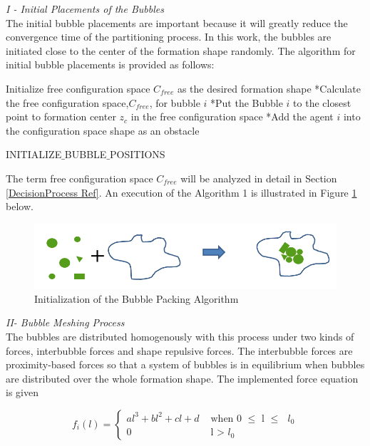 \textit{			I - Initial Placements of the Bubbles} \\ 
The initial bubble placements are important because it will greatly reduce the convergence time of the partitioning process. In this work, the bubbles are initiated close to the center of the formation shape randomly. The algorithm for initial bubble placements is provided as follows:
			
\begin{algorithm}[H]
Initialize free configuration space $C_{free}$ as the desired formation shape \newline
{}
{		
*Calculate the free configuration space,$C_{free}$, for bubble $i$\;
*Put the Bubble $i$ to the closest point to  formation center  $z_c$  in the free configuration space\;
*Add the agent $i$ into the configuration space shape as an obstacle \;
}
				
\caption{INITIALIZE$\_$BUBBLE$\_$POSITIONS}
\end{algorithm}
		
The term free configuration space $C_{free}$ will be analyzed in detail in Section \ref{DecisionProcess Ref}. An execution of the Algorithm 1 is illustrated in Figure \ref{algorithm1_ref} below.
		
\begin{figure}[H]
\caption{Initialization of the Bubble Packing Algorithm} \label{algorithm1_ref}
\centering
\includegraphics[scale = 0.50]{bubble_packing}
\end{figure}
				
\textit{			II- Bubble Meshing Process } \\ 
The bubbles are distributed homogenously with this process under two kinds of forces, interbubble forces and shape repulsive forces. The interbubble forces are proximity-based forces so that a system of bubbles is in equilibrium when bubbles are distributed over the whole formation shape. The implemented force equation is given
		
\begin{equation}
f_i(l) = \left\{ \begin{array}{rl}
al^3 + bl^2 + cl + d &\mbox{ when 0 $\leq$ l $\leq$ $l_0$} \\
0                               &\mbox{ l > $l_0$}
\end{array} \right.
\end{equation}

